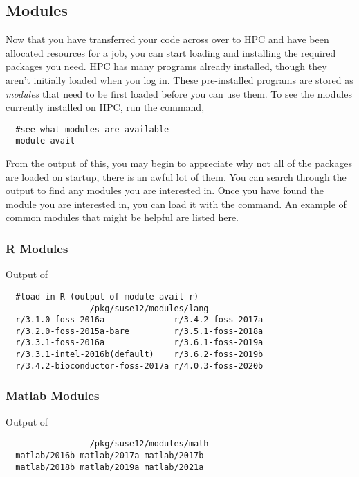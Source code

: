\subsection{Modules}
Now that you have transferred your code across over to HPC and have been allocated resources for a job, you can start loading and installing the required packages you need. HPC has many programs already installed, though they aren't initially loaded when you log in. These pre-installed programs are stored as \textit{modules} that need to be first loaded before you can use them. To see the modules currently installed on HPC, run the command,
%
%
\\
\par
\begin{verbatim}
  #see what modules are available
  module avail
\end{verbatim}
From the output of this, you may begin to appreciate why not all of the packages are loaded on startup, there is an awful lot of them. You can search through the output to find any modules you are interested in. Once you have found the module you are interested in, you can load it with the  command. An example of common modules that might be helpful are listed here.
%
\\
%
\subsubsection{R Modules}
Output of 
\begin{verbatim}
  #load in R (output of module avail r)
  -------------- /pkg/suse12/modules/lang --------------
  r/3.1.0-foss-2016a              r/3.4.2-foss-2017a             
  r/3.2.0-foss-2015a-bare         r/3.5.1-foss-2018a             
  r/3.3.1-foss-2016a              r/3.6.1-foss-2019a             
  r/3.3.1-intel-2016b(default)    r/3.6.2-foss-2019b
  r/3.4.2-bioconductor-foss-2017a r/4.0.3-foss-2020b
\end{verbatim}
%
%
\subsubsection{Matlab Modules}
Output of 
\begin{verbatim}
  -------------- /pkg/suse12/modules/math --------------
  matlab/2016b matlab/2017a matlab/2017b
  matlab/2018b matlab/2019a matlab/2021a
\end{verbatim}
%
%
